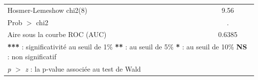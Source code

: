 \begin{table}[htbp]
\begin{tabular}{lcc}
\quad Hosmer-Lemeshow chi2(8) & \multicolumn{2}{c}{9.56} \\
\quad Prob $>$ chi2 & \multicolumn{2}{c}{.} \\
\midrule
Aire sous la courbe ROC (AUC) & \multicolumn{2}{c}{0.6385} \\
\bottomrule
\multicolumn{3}{l}{\footnotesize \textbf{***} : significativit\'e au seuil de 1\% \quad \textbf{**} : au seuil de 5\% \quad \textbf{*} : au seuil de 10\% \quad \textbf{NS} : non significatif} \\
\multicolumn{3}{l}{\footnotesize \textit{p $>$ z} : la p-value associ\'ee au test de Wald} \\
\end{tabular}
\end{table}